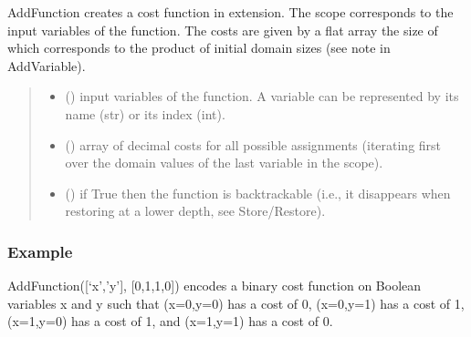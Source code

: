 \documentclass[letterpaper,10pt,openany,oneside,english]{sphinxmanual}
\begin{document}
\begin{fulllineitems}
\begin{fulllineitems}
\label{\detokenize{ref/ref_python:pytoulbar2.CFN.AddFunction}}
\pysigstartsignatures
{}
\pysigstopsignatures
\sphinxAtStartPar
AddFunction creates a cost function in extension. The scope corresponds to the input variables of the function.
The costs are given by a flat array the size of which corresponds to the product of initial domain sizes (see note in AddVariable).
\begin{quote}\begin{description}
\begin{itemize}
\item {} 
\sphinxAtStartPar
{} () \textendash{} input variables of the function. A variable can be represented by its name (str) or its index (int).

\item {} 
\sphinxAtStartPar
{} () \textendash{} array of decimal costs for all possible assignments (iterating first over the domain values of the last variable in the scope).

\item {} 
\sphinxAtStartPar
{} () \textendash{} if True then the function is backtrackable (i.e., it disappears when restoring at a lower depth, see Store/Restore).

\end{itemize}

\end{description}\end{quote}
\subsubsection*{Example}

\sphinxAtStartPar
AddFunction({[}‘x’,’y’{]}, {[}0,1,1,0{]}) encodes a binary cost function on Boolean variables x and y such that (x=0,y=0) has a cost of 0,
(x=0,y=1) has a cost of 1, (x=1,y=0) has a cost of 1, and (x=1,y=1) has a cost of 0.

\end{fulllineitems}


\end{fulllineitems}
\end{document}
